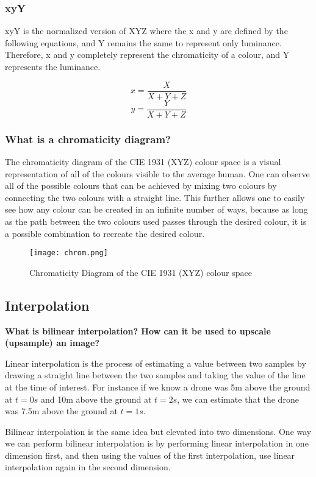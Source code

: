 \documentclass[12pt, letterpaper]{article}
\begin{document}
\subsubsection{xyY}

xyY is the normalized version of XYZ where the x and y are defined by the following equations, and Y remains the same to represent only luminance. Therefore, x and y completely represent the chromaticity of a colour, and Y represents the luminance.

\[ x =  \frac{X}{X+Y+Z}\]
\[ y =  \frac{Y}{X+Y+Z}\]

\subsubsection{What is a chromaticity diagram?}

The chromaticity diagram of the CIE 1931 (XYZ) colour space is a visual representation of all of the colours visible to the average human. One can observe all of the possible colours that can be achieved by mixing two colours by connecting the two colours with a straight line. This further allows one to easily see how any colour can be created in an infinite number of ways, because as long as the path between the two colours used passes through the desired colour, it is a possible combination to recreate the desired colour.

\begin{figure}[h]
    \centering
    \texttt{[image: chrom.png]}
    \caption{Chromaticity Diagram of the CIE 1931 (XYZ) colour space}
    \label{fig:chromaticity}
\end{figure}

\subsection{Interpolation}
\textbf{What is bilinear interpolation? How can it be used to upscale (upsample) an image?}

Linear interpolation is the process of estimating a value between two samples by drawing a straight line between the two samples and taking the value of the line at the time of interest. For instance if we know a drone was 5m above the ground at $t = 0s$ and 10m above the ground at $t = 2s$, we can estimate that the drone was 7.5m above the ground at $t=1s$.

Bilinear interpolation is the same idea but elevated into two dimensions. One way we can perform bilinear interpolation is by performing linear interpolation in one dimension first, and then using the values of the first interpolation, use linear interpolation again in the second dimension.
\end{document}
